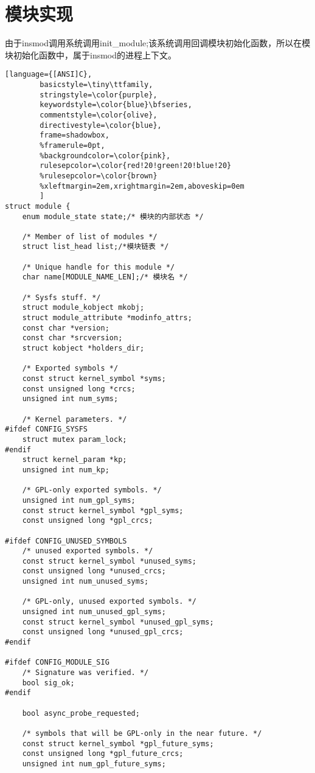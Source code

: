 \chapter{模块实现}


由于insmod调用系统调用init\_module;该系统调用回调模块初始化函数，所以在模块初始化函数中，属于insmod的进程上下文。


\begin{lstlisting}[language={[ANSI]C},
        basicstyle=\tiny\ttfamily,
        stringstyle=\color{purple},
        keywordstyle=\color{blue}\bfseries,
        commentstyle=\color{olive},
        directivestyle=\color{blue},
        frame=shadowbox,
        %framerule=0pt,
        %backgroundcolor=\color{pink},
        rulesepcolor=\color{red!20!green!20!blue!20}
        %rulesepcolor=\color{brown}
        %xleftmargin=2em,xrightmargin=2em,aboveskip=0em
        ]
struct module {
	enum module_state state;/* 模块的内部状态 */

	/* Member of list of modules */
	struct list_head list;/*模块链表 */

	/* Unique handle for this module */
	char name[MODULE_NAME_LEN];/* 模块名 */

	/* Sysfs stuff. */
	struct module_kobject mkobj;
	struct module_attribute *modinfo_attrs;
	const char *version;
	const char *srcversion;
	struct kobject *holders_dir;

	/* Exported symbols */
	const struct kernel_symbol *syms;
	const unsigned long *crcs;
	unsigned int num_syms;

	/* Kernel parameters. */
#ifdef CONFIG_SYSFS
	struct mutex param_lock;
#endif
	struct kernel_param *kp;
	unsigned int num_kp;

	/* GPL-only exported symbols. */
	unsigned int num_gpl_syms;
	const struct kernel_symbol *gpl_syms;
	const unsigned long *gpl_crcs;

#ifdef CONFIG_UNUSED_SYMBOLS
	/* unused exported symbols. */
	const struct kernel_symbol *unused_syms;
	const unsigned long *unused_crcs;
	unsigned int num_unused_syms;

	/* GPL-only, unused exported symbols. */
	unsigned int num_unused_gpl_syms;
	const struct kernel_symbol *unused_gpl_syms;
	const unsigned long *unused_gpl_crcs;
#endif

#ifdef CONFIG_MODULE_SIG
	/* Signature was verified. */
	bool sig_ok;
#endif

	bool async_probe_requested;

	/* symbols that will be GPL-only in the near future. */
	const struct kernel_symbol *gpl_future_syms;
	const unsigned long *gpl_future_crcs;
	unsigned int num_gpl_future_syms;


\end{lstlisting}
